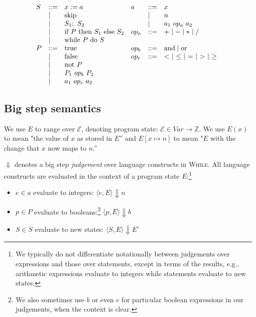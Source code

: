 \documentclass[11pt]{article}
\def\Integer{\mathbb{Z}}
\def\While{\textsc{While}}
\begin{document}
\[
\begin{array}{llllll}
S & ::= & x := a & a & ::= & x \\
  & \mathrel{\mid} & \mbox{skip} & & \mathrel{\mid} & n \\
  & \mathrel{\mid} & S_1;~ S_2 &  & \mathrel{\mid} & a_1 ~op_a~ a_2 \\
  & \mathrel{\mid} & \mbox{if}~ P ~\mbox{then}~ S_1 ~\mbox{else}~ S_2 & op_a & ::= & + \mathrel{\mid} - \mathrel{\mid} * \mathrel{\mid} / \\
  & \mathrel{\mid} & \mbox{while}~ P ~\mbox{do}~ S \\
  
P & ::= & \mbox{true}  & op_b & ::= & \mbox{and} \mathrel{\mid} \mbox{or} \\
  & \mathrel{\mid} & \mbox{false} & op_r & ::= & <~ \mathrel{\mid} ~\le~ \mathrel{\mid} ~=~ \mathrel{\mid} ~>~ \mathrel{\mid} ~\ge~ \\
  & \mathrel{\mid} & \mbox{not}~ P \\
  & \mathrel{\mid} & P_1 ~op_b~ P_2 \\
  & \mathrel{\mid} & a_1 ~op_r~ a_2 \\

\end{array}
\]

\subsection{Big step semantics}

We use $E$ to range over $\mathcal{E}$, denoting program state: 
$\mathcal{E} \in \textit{Var} \rightarrow \Integer$.  We use $E(x)$ to mean "the value of $x$ as stored in $E$'' and $E[x \mapsto n]$ to mean "$E$ with the change that $x$ now maps to $n$.''

$\Downarrow$ denotes a big step \emph{judgement} over language constructs in \While.  All language constructs are evaluated in the context of a program state $E$:\footnote{We typically do not differentiate notationally between judgements over expressions and those over statements, except in terms of the results, e.g., arithmetic expressions evaluate to integers while statements evaluate to new states.}  

\begin{itemize}[labelwidth=0.7em, labelsep=0.6em, topsep=0ex, itemsep=0ex,
  parsep=0ex] 
\item $e \in a$ evaluate to integers: $\langle e, E \rangle \Downarrow n$
\item $p \in P$ evaluate to booleans:\footnote{We also sometimes use $b$ or even $e$ for particular boolean expressions in our judgements, when the context is clear.} $\langle p, E \rangle \Downarrow b$
\item $S \in S$ evaluate to new states: $\langle S, E \rangle \Downarrow E'$
\end{itemize}
\end{document}
